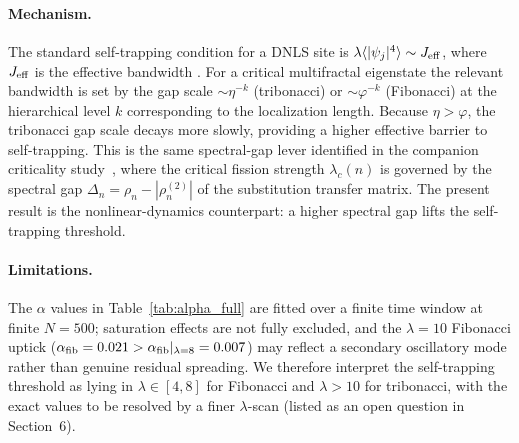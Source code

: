 \paragraph{Mechanism.}
The standard self-trapping condition for a DNLS site is
$\lambda \langle |\psi_j|^4 \rangle \sim J_{\rm eff}$, where $J_{\rm eff}$
is the effective bandwidth \cite{Eilbeck1985,Kevrekidis2009}.
For a critical multifractal eigenstate the relevant bandwidth is set by
the gap scale $\sim \eta^{-k}$ (tribonacci) or $\sim \varphi^{-k}$
(Fibonacci) at the hierarchical level $k$ corresponding to the
localization length. Because $\eta > \varphi$, the tribonacci gap scale
decays more slowly, providing a higher effective barrier to self-trapping.
This is the same spectral-gap lever identified in the companion criticality
study~\cite{Grossi2026Criticality}, where the critical fission strength
$\lambda_c(n)$ is governed by the spectral gap $\Delta_n = \rho_n -
|\rho_n^{(2)}|$ of the substitution transfer matrix. The present result is
the nonlinear-dynamics counterpart: a higher spectral gap lifts the
self-trapping threshold.

\paragraph{Limitations.}
The $\alpha$ values in Table~\ref{tab:alpha_full} are fitted over a finite
time window at finite $N=500$; saturation effects are not fully excluded,
and the $\lambda=10$ Fibonacci uptick ($\alpha_{\rm fib} = 0.021 >
\alpha_{\rm fib}|_{\lambda=8} = 0.007$) may reflect a secondary oscillatory
mode rather than genuine residual spreading. We therefore interpret the
self-trapping threshold as lying in $\lambda \in [4, 8]$ for Fibonacci and
$\lambda > 10$ for tribonacci, with the exact values to be resolved by
a finer $\lambda$-scan (listed as an open question in Section~6).

